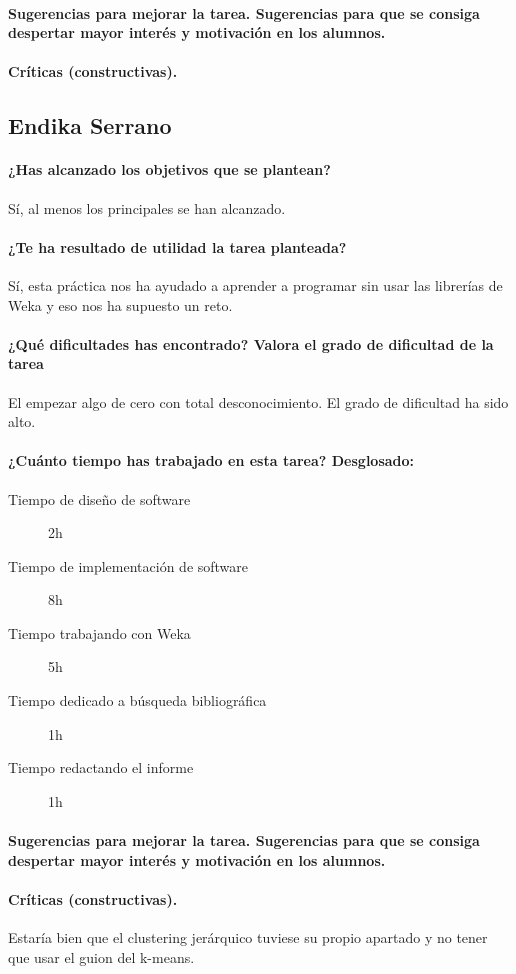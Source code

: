 \documentclass[11pt, titlepage,a4paper]{article}
\begin{document}
\paragraph{Sugerencias para mejorar la tarea. Sugerencias para que se consiga despertar mayor
interés y motivación en los alumnos.\\}

\paragraph{Críticas (constructivas).\\}

\subsection{Endika Serrano}
\paragraph{¿Has alcanzado los objetivos que se plantean?\\}
Sí, al menos los principales se han alcanzado.
\paragraph{¿Te ha resultado de utilidad la tarea planteada?\\}
Sí, esta práctica nos ha ayudado a aprender a programar sin usar las librerías de Weka y eso nos ha supuesto un reto.
 \paragraph{¿Qué dificultades has encontrado? Valora el grado de dificultad de
la tarea\\}
El empezar algo de cero con total desconocimiento. El grado de dificultad ha
sido alto.
\paragraph{¿Cuánto tiempo has trabajado en esta tarea? Desglosado:\\}
\begin{description}
	\item[Tiempo de diseño de software] 2h
	\item[Tiempo de implementación de software] 8h
	\item[Tiempo trabajando con Weka] 5h
	\item[Tiempo dedicado a búsqueda bibliográfica] 1h
	\item[Tiempo redactando el informe] 1h
\end{description}

\paragraph{Sugerencias para mejorar la tarea. Sugerencias para que se consiga despertar mayor
interés y motivación en los alumnos.\\}

\paragraph{Críticas (constructivas).\\}
Estaría bien que el clustering jerárquico tuviese su propio apartado y no tener
que usar el guion del k-means.
\end{document}
